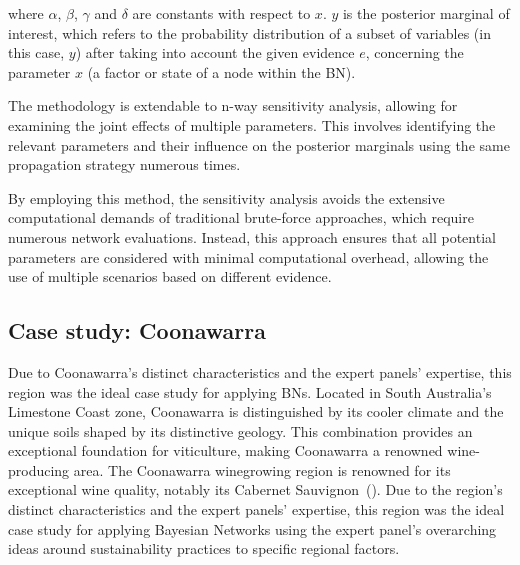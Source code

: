 \documentclass[10pt,letterpaper]{article}
\begin{document}
where $\alpha$, $\beta$, $\gamma$ and $\delta$ are constants with respect to $x$. $y$ is the posterior marginal of interest, which refers to the probability distribution of a subset of variables (in this case, $y$) after taking into account the given evidence $e$, concerning the parameter $x$ (a factor or state of a node within the BN).








The methodology is extendable to n-way sensitivity analysis, allowing for examining the joint effects of multiple parameters. This involves identifying the relevant parameters and their influence on the posterior marginals using the same propagation strategy numerous times.

By employing this method, the sensitivity analysis avoids the extensive computational demands of traditional brute-force approaches, which require numerous network evaluations. Instead, this approach ensures that all potential parameters are considered with minimal computational overhead, allowing the use of multiple scenarios based on different evidence.

\subsection*{Case study: Coonawarra}

Due to Coonawarra's distinct characteristics and the expert panels' expertise, this region was the ideal case study for applying BNs. Located in South Australia's Limestone Coast zone, Coonawarra is distinguished by its cooler climate and the unique soils shaped by its distinctive geology. This combination provides an exceptional foundation for viticulture, making Coonawarra a renowned wine-producing area. The Coonawarra winegrowing region is renowned for its exceptional wine quality, notably its Cabernet Sauvignon~(\cite{hallidayAustralianWineEncyclopedia2009}). Due to the region's distinct characteristics and the expert panels' expertise, this region was the ideal case study for applying Bayesian Networks using the expert panel's overarching ideas around sustainability practices to specific regional factors.
\end{document}
